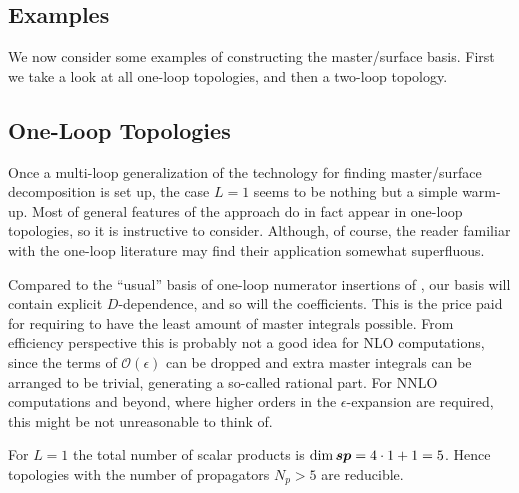

\subsection{Examples}
\label{sec:ms_examples}

We now consider some examples of constructing the master/surface basis.
First we take a look at all one-loop topologies, 
and then a two-loop topology.

\subsection{One-Loop Topologies}

Once a multi-loop generalization of the technology for finding master/surface decomposition 
is set up, the case $L=1$ seems to be nothing but a simple warm-up. 
Most of general features of the approach do in fact appear in one-loop topologies,
so it is instructive to consider.
Although, of course, the reader familiar with the one-loop literature may find
their application somewhat superfluous.

Compared to the ``usual'' basis of one-loop numerator insertions of \cite{Ossola:2006us,Giele:2008ve},
our basis will contain explicit $D$-dependence, and so will the coefficients.
This is the price paid for requiring to have the least amount of master integrals possible.
From efficiency perspective this is probably not a good idea for NLO computations,
since the terms of $\mathcal{O}(\epsilon)$ can be dropped
and extra master integrals can be arranged to be trivial, generating a so-called rational part.
For NNLO computations and beyond, where higher orders in the $\epsilon$-expansion are required, 
this might be not unreasonable to think of.

For $L=1$ the total number of scalar products is $\dim{\vb*{sp}} = 4\cdot 1+ 1 = 5$.
Hence topologies with the number of propagators $N_p>5$ are reducible.


